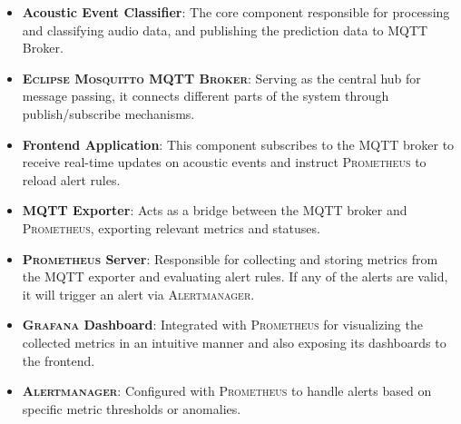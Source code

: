 \begin{itemize}
  \item \textbf{Acoustic Event Classifier}: The core component responsible for processing and classifying audio data, and publishing the prediction data to MQTT Broker.
  \item \textbf{\textsc{Eclipse Mosquitto MQTT Broker}}: Serving as the central hub for message passing, it connects different parts of the system through publish/subscribe mechanisms.
  \item \textbf{Frontend Application}: This component subscribes to the MQTT broker to receive real-time updates on acoustic events and instruct \textsc{Prometheus} to reload alert rules.
  \item \textbf{MQTT Exporter}: Acts as a bridge between the MQTT broker and \textsc{Prometheus}, exporting relevant metrics and statuses.
  \item \textbf{\textsc{Prometheus} Server}: Responsible for collecting and storing metrics from the MQTT exporter and evaluating alert rules. If any of the alerts are valid, it will trigger an alert via \textsc{Alertmanager}.
  \item \textbf{\textsc{Grafana} Dashboard}: Integrated with \textsc{Prometheus} for visualizing the collected metrics in an intuitive manner and also exposing its dashboards to the frontend.
  \item \textbf{\textsc{Alertmanager}}: Configured with \textsc{Prometheus} to handle alerts based on specific metric thresholds or anomalies.
\end{itemize}

